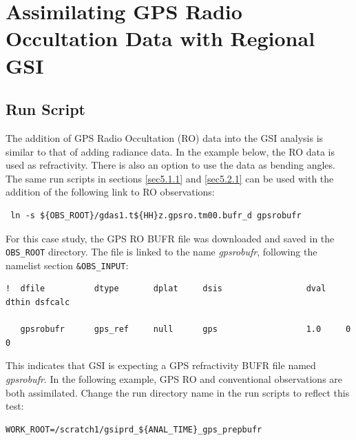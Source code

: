 \section{Assimilating GPS Radio Occultation Data with Regional GSI}

\subsection{Run Script}

The addition of GPS Radio Occultation (RO) data into the GSI analysis is similar to that of adding radiance data. In the example below, the RO data is used as refractivity.  There is also an option to use the data as bending angles. The same run scripts in sections \ref{sec5.1.1} and \ref{sec5.2.1} can be used with the addition of the following link to RO observations:

\begin{scriptsize}
\begin{verbatim}
 ln -s ${OBS_ROOT}/gdas1.t${HH}z.gpsro.tm00.bufr_d gpsrobufr
\end{verbatim}
\end{scriptsize}

For this case study, the GPS RO BUFR file was downloaded and saved in the \verb|OBS_ROOT| directory.  The file is linked to the name \textit{gpsrobufr}, following the namelist section \verb|&OBS_INPUT|:

\begin{scriptsize}
\begin{verbatim}
!  dfile          dtype       dplat     dsis                 dval    dthin dsfcalc

   gpsrobufr      gps_ref     null      gps                  1.0     0     0
\end{verbatim}
\end{scriptsize}
This indicates that GSI is expecting a GPS refractivity BUFR file named \textit{gpsrobufr}.  In the following example, GPS RO and conventional observations are both assimilated.  Change the run directory name in the run scripts to reflect this test:

\begin{scriptsize}
\begin{verbatim}
WORK_ROOT=/scratch1/gsiprd_${ANAL_TIME}_gps_prepbufr
\end{verbatim}
\end{scriptsize}

